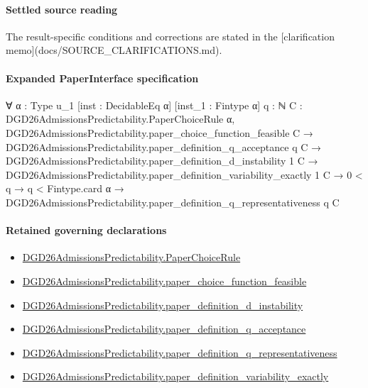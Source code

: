 \documentclass[10pt]{article}
\begin{document}
\paragraph{Settled source reading}
The result-\allowbreak{}specific conditions and corrections are stated in the [clarification memo](docs/\allowbreak{}SOURCE\_\allowbreak{}CLARIFICATIONS.\allowbreak{}md).\allowbreak{}

\paragraph{Expanded PaperInterface specification}
\begin{ReviewVerbatim}
∀ {α : Type u_1} [inst : DecidableEq α] [inst_1 : Fintype α] {q : ℕ}
  {C : DGD26AdmissionsPredictability.PaperChoiceRule α},
  DGD26AdmissionsPredictability.paper_choice_function_feasible C →
    DGD26AdmissionsPredictability.paper_definition_q_acceptance q C →
      DGD26AdmissionsPredictability.paper_definition_d_instability 1 C →
        DGD26AdmissionsPredictability.paper_definition_variability_exactly 1 C →
          0 < q → q < Fintype.card α → DGD26AdmissionsPredictability.paper_definition_q_representativeness q C
\end{ReviewVerbatim}

\paragraph{Retained governing declarations}
\begin{itemize}\raggedright
\item \hyperlink{governing-declaration-4678951b4432b184}{DGD26\allowbreak{}Admissions\allowbreak{}Predictability.\allowbreak{}Paper\allowbreak{}Choice\allowbreak{}Rule}
\item \hyperlink{governing-declaration-f7de74a44053f6d5}{DGD26\allowbreak{}Admissions\allowbreak{}Predictability.\allowbreak{}paper\_\allowbreak{}choice\_\allowbreak{}function\_\allowbreak{}feasible}
\item \hyperlink{governing-declaration-ce2c1c7a5233a84a}{DGD26\allowbreak{}Admissions\allowbreak{}Predictability.\allowbreak{}paper\_\allowbreak{}definition\_\allowbreak{}d\_\allowbreak{}instability}
\item \hyperlink{governing-declaration-7ecd62274fb2f391}{DGD26\allowbreak{}Admissions\allowbreak{}Predictability.\allowbreak{}paper\_\allowbreak{}definition\_\allowbreak{}q\_\allowbreak{}acceptance}
\item \hyperlink{governing-declaration-1099c3b9d08feae8}{DGD26\allowbreak{}Admissions\allowbreak{}Predictability.\allowbreak{}paper\_\allowbreak{}definition\_\allowbreak{}q\_\allowbreak{}representativeness}
\item \hyperlink{governing-declaration-ce6697be3f1c2256}{DGD26\allowbreak{}Admissions\allowbreak{}Predictability.\allowbreak{}paper\_\allowbreak{}definition\_\allowbreak{}variability\_\allowbreak{}exactly}
\end{itemize}
\end{document}
